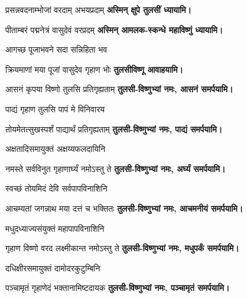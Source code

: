 \renewcommand{\devAya}{तुलसी-विष्णुभ्यां नमः,}
\begin{center}

{प्रसन्नवदनाम्भोजां वरदाम् अभयप्रदाम्}
\textbf{अस्मिन् क्षुपे तुलसीं ध्यायामि।}
\medskip

{पीताम्बरं पद्मनेत्रं वासुदेवं वरप्रदम्}
\textbf{अस्मिन् आमलक-स्कन्धे महाविष्णुं ध्यायामि।}
\medskip

{आगच्छ पूजाभवने सदा सन्निहिता भव}

{क्रियमाणां मया पूजां वासुदेव गृहाण भोः} 
\textbf{तुलसीविष्णू आवाहयामि।}
\medskip

{आसनं कृपया विष्णो तुलसि प्रतिगृह्यताम्}
\textbf{\devAya{} आसनं समर्पयामि।}
\medskip

{पाद्यं गृहाण तुलसि पापं मे विनिवारय}

{तोयमेतत्सुखस्पर्शं पाद्यार्थं प्रतिगृह्यताम्}
\textbf{\devAya{} पाद्यं समर्पयामि।}
\medskip

{अक्षतादिसमायुक्तं अक्षय्यफलदायिनि}

{नमस्ते सर्वविनुत गृहाणार्घ्यं नमोऽस्तु ते}
\textbf{\devAya{} अर्घ्यं समर्पयामि।}
\medskip

\begin{minipage}{\linewidth}
\centering
{}
{स्वच्छं तोयमिदं देवि सर्वपापविनाशिनि}

{आचम्यतां जगन्नाथ मया दत्तं च भक्तितः}
\textbf{\devAya{} आचमनीयं समर्पयामि।}
\medskip
\end{minipage}

{मधुदध्याज्यसंयुक्तं महापापविनाशिनि}

{गृहाण विष्णो वरद लक्ष्मीकान्त नमोऽस्तु ते}
\textbf{\devAya{} मधुपर्कं समर्पयामि।}
\medskip

{दधिक्षीरसमायुक्तं दामोदरकुटुम्बिनि}

{पञ्चामृतं गृहाणेदं भक्तानामिष्टदायक}
\textbf{\devAya{} पञ्चामृतं समर्पयामि।}
\medskip


\end{center}
